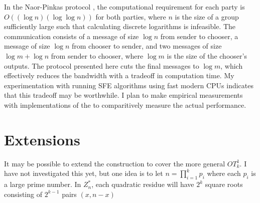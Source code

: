 In the Naor-Pinkas protocol \cite{Noar-Pinkas:2001}, the computational
requirement for each party is $O((\log n)(\log\log n))$ for both
parties, where $n$ is the size of a group sufficiently large such
that calculating discrete logarithms is infeasible. The communication
consists of a message of size $\log n$ from sender to chooser, a
message of size $\log n$ from chooser to sender, and two messages
of size $\log m+\log n$ from sender to chooser, where $\log m$ is
the size of the chooser's outputs. The protocol presented here cuts
the final messages to $\log m$, which effectively reduces the bandwidth
with a tradeoff in computation time. My experimentation with running
SFE algorithms using fast modern CPUs indicates that this tradeoff
may be worthwhile. I plan to make empirical measurements with implementations
of the to comparitively measure the actual performance.


\section{Extensions}

It may be possible to extend the construction to cover the more general
$OT_{k}^{1}$. I have not investigated this yet, but one idea is to
let $n=\prod_{i=1}^{k}p_{i}$ where each $p_{i}$ is a large prime
number. In $Z_{n}^{*}$, each quadratic residue will have $2^{k}$
square roots consisting of $2^{k-1}$ pairs $(x,n-x)$

%
\begin{comment}



\end{comment}
{}


